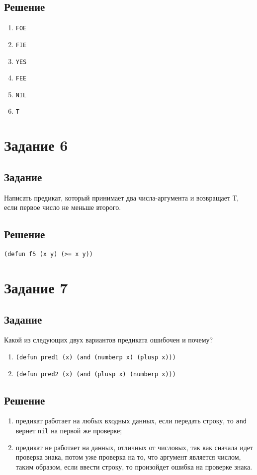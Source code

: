 \subsection*{Решение}
\begin{enumerate}
	\item \texttt{FOE}
	\item \texttt{FIE}
	\item \texttt{YES}
	\item \texttt{FEE}
	\item \texttt{NIL}
	\item \texttt{T}
\end{enumerate}


\section{Задание 6}
\subsection*{Задание}
Написать предикат, который принимает два числа-аргумента и возвращает Т, если первое число не меньше второго.

\subsection*{Решение}
\begin{code}
\begin{verbatim}
(defun f5 (x y) (>= x y))
\end{verbatim}
\end{code}


\section{Задание 7}
\subsection*{Задание}
Какой из следующих двух вариантов предиката ошибочен и почему?

\begin{enumerate}
	\item \texttt{(defun pred1 (x) (and (numberp x) (plusp x)))}
	\item \texttt{(defun pred2 (x) (and (plusp x) (numberp x)))}
\end{enumerate}

\subsection*{Решение}
\begin{enumerate}
	\item предикат работает на любых входных данных, если передать строку, то \texttt{and} вернет \texttt{nil} на первой же проверке;
	\item предикат не работает на данных, отличных от числовых, так как сначала идет проверка знака, потом уже проверка на то, что аргумент является числом, таким образом, если ввести строку, то произойдет ошибка на проверке знака.
\end{enumerate}


